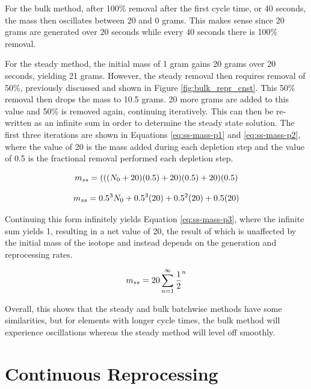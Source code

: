 For the bulk method, after 100\% removal after the first cycle time, or 40 seconds, the mass then oscillates between 20 and 0 grams. This makes sense since 20 grams are generated over 20 seconds while every 40 seconds there is 100\% removal. 

For the steady method, the initial mass of 1 gram gains 20 grams over 20 seconds, yielding 21 grams. However, the steady removal then requires removal of 50\%, previously discussed and shown in Figure \ref{fig:bulk_repr_cnst}. This 50\% removal then drops the mass to 10.5 grams. 20 more grams are added to this value and 50\% is removed again, continuing iteratively. This can then be re-written as an infinite sum in order to determine the steady state solution. The first three iterations are shown in Equations \eqref{eq:ss-mass-p1} and \eqref{eq:ss-mass-p2}, where the value of 20 is the mass added during each depletion step and the value of 0.5 is the fractional removal performed each depletion step.

\begin{equation} \hfill 
m_{ss} = (((N_0+20)(0.5)+20)(0.5)+20)(0.5)
\hfill\label{eq:ss-mass-p1} \end{equation}

\begin{equation} \hfill 
m_{ss} = 0.5^3 N_0 + 0.5^3 (20) + 0.5^2 (20) + 0.5 (20)
\hfill\label{eq:ss-mass-p2} \end{equation}

Continuing this form infinitely yields Equation \eqref{eq:ss-mass-p3}, where the infinite sum yields 1, resulting in a net value of 20, the result of which is unaffected by the initial mass of the isotope and instead depends on the generation and reprocessing rates.

\begin{equation} \hfill 
m_{ss} = 20 \sum_{n=1}^\infty \frac{1}{2}^n 
\hfill\label{eq:ss-mass-p3} \end{equation}


Overall, this shows that the steady and bulk batchwise methods have some similarities, but for elements with longer cycle times, the bulk method will experience oscillations whereas the steady method will level off smoothly.

\section{Continuous Reprocessing}

